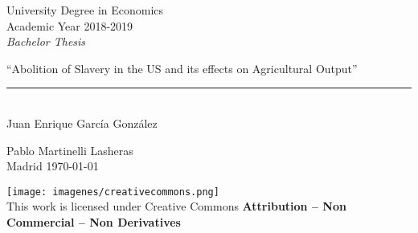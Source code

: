 \documentclass[12pt]{report}
\begin{document}

\begin{titlepage}
	\begin{sffamily}
	\color{azulUC3M}
	\begin{center}
		\begin{figure}[H] 
		\end{figure}
		\vspace{2.5cm}
		\begin{Large}
			University Degree in Economics\\			
			Academic Year 2018-2019\\
			\vspace{2cm}		
			\textsl{Bachelor Thesis}
			\bigskip
			
		\end{Large}
		 	{\Huge ``Abolition of Slavery in the US and its effects on Agricultural Output''}\\
		 	\vspace*{0.5cm}
	 		\rule{10.5cm}{0.1mm}\\
			\vspace*{0.9cm}
			{\LARGE Juan Enrique García González}\\ 
			\vspace*{1cm}
		\begin{Large}
			Pablo Martinelli Lasheras \\
			Madrid \today\\
		\end{Large}
	\end{center}
	\vfill
	\color{black}
	\texttt{[image: imagenes/creativecommons.png]}\\  %
	This work is licensed under Creative Commons \textbf{Attribution – Non Commercial – Non Derivatives}
	\end{sffamily}
\end{titlepage}

\newpage 
\thispagestyle{empty}
\mbox{}
\end{document}
